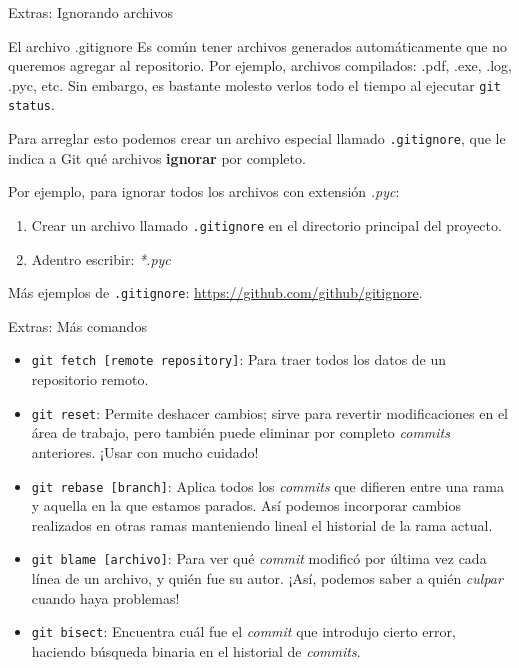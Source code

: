 \begin{frame}[t]{Extras: Ignorando archivos}

    \begin{block}{El archivo .gitignore}
      Es común tener archivos generados automáticamente que no queremos agregar al repositorio. Por ejemplo, archivos compilados: .pdf, .exe, .log, .pyc, etc. Sin embargo, es bastante molesto verlos todo el tiempo al ejecutar \texttt{git status}.

      Para arreglar esto podemos crear un archivo especial llamado \texttt{.gitignore}, que le indica a Git qué archivos \textbf{ignorar} por completo.
    \end{block}

    \pause
    \begin{resumen}{}
      Por ejemplo, para ignorar todos los archivos con extensión \textit{.pyc}:
      \begin{enumerate}
        \item Crear un archivo llamado \texttt{.gitignore} en el directorio principal del proyecto.
        \item Adentro escribir: \textit{*.pyc}
      \end{enumerate}
      Más ejemplos de \texttt{.gitignore}: \url{https://github.com/github/gitignore}.
    \end{resumen}


\end{frame}

\begin{frame}[t]{Extras: Más comandos}

    \begin{itemize}
        \item \texttt{git fetch [remote repository]}: Para traer todos los datos de un repositorio remoto.
        \item \texttt{git reset}: Permite deshacer cambios; sirve para revertir modificaciones en el área de trabajo, pero también puede eliminar por completo \textit{commits} anteriores. ¡Usar con mucho cuidado!
        \item \texttt{git rebase [branch]}: Aplica todos los \textit{commits} que difieren entre una rama y aquella en la que estamos parados. Así podemos incorporar cambios realizados en otras ramas manteniendo lineal el historial de la rama actual.
        \item \texttt{git blame [archivo]}: Para ver qué \textit{commit} modificó por última vez cada línea de un archivo, y quién fue su autor. ¡Así, podemos saber a quién \textit{culpar} cuando haya problemas!
        \item \texttt{git bisect}: Encuentra cuál fue el \textit{commit} que introdujo cierto error, haciendo búsqueda binaria en el historial de \textit{commits}.
    \end{itemize}

\end{frame}


